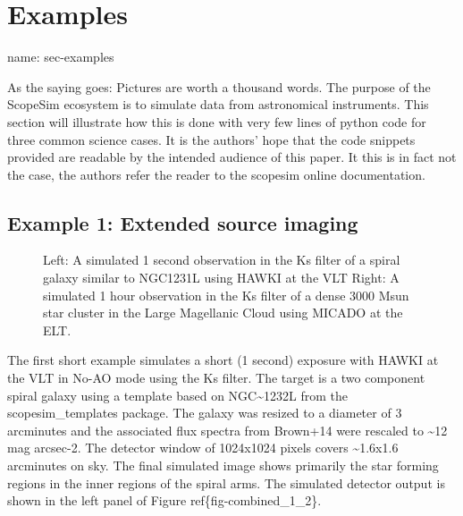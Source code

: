

\section{Examples%
  \label{examples}%
}

\begin{DUfieldlist}
\item[{name:}]
sec-examples
\end{DUfieldlist}

As the saying goes: Pictures are worth a thousand words.
The purpose of the ScopeSim ecosystem is to simulate data from astronomical instruments.
This section will illustrate how this is done with very few lines of python code for three common science cases.
It is the authors' hope that the code snippets provided are readable by the intended audience of this paper.
It this is in fact not the case, the authors refer the reader to the scopesim online documentation.


\subsection{Example 1: Extended source imaging%
  \label{example-1-extended-source-imaging}%
}

\begin{figure}[H]
\noindent{}\label{fig-combined-1-2}

\caption{Left: A simulated 1 second observation in the Ks filter of a spiral galaxy similar to NGC1231L using HAWKI at the VLT
Right: A simulated 1 hour observation in the Ks filter of a dense 3000 Msun star cluster in the Large Magellanic Cloud using MICADO at the ELT.}
\end{figure}

The first short example simulates a short (1 second) exposure with HAWKI at the VLT in No-AO mode using the Ks filter.
The target is a two component spiral galaxy using a template based on NGC\textasciitilde{}1232L from the scopesim\_templates package.
The galaxy was resized to a diameter of 3 arcminutes and the associated flux spectra from Brown+14 were rescaled to \textasciitilde{}12 mag arcsec-2.
The detector window of 1024x1024 pixels covers \textasciitilde{}1.6x1.6 arcminutes on sky.
The final simulated image shows primarily the star forming regions in the inner regions of the spiral arms.
The simulated detector output is shown in the left panel of Figure ref\{fig-combined\_1\_2\}.

